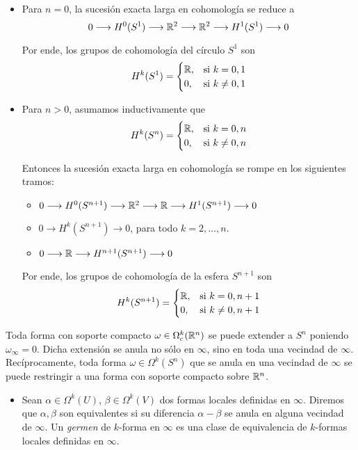 \begin{solution}
\begin{itemize}
    \item Para $n = 0$, la sucesión exacta larga en cohomología se reduce a
    $$
    0
        \longrightarrow H^0(S^1) \longrightarrow \mathbb R^2 \longrightarrow \mathbb R^2
        \longrightarrow H^1(S^1) \longrightarrow 0
    $$
    
    Por ende, los grupos de cohomología del círculo $S^1$ son
    $$
    H^k(S^1) =
        \begin{cases}
            \mathbb R, & \text{si } k = 0, 1 \\
            0, & \text{si } k \ne 0, 1
        \end{cases}
    $$
    
    \item Para $n > 0$, asumamos inductivamente que
    $$
    H^k(S^n) =
        \begin{cases}
            \mathbb R, & \text{si } k = 0, n \\
            0, & \text{si } k \ne 0, n
        \end{cases}
    $$
    
    Entonces la sucesión exacta larga en cohomología se rompe en los siguientes tramos:
    \begin{itemize}
        \item $0
        \longrightarrow H^0(S^{n+1})
        \longrightarrow \mathbb R^2
        \longrightarrow \mathbb R
        \longrightarrow H^1(S^{n+1})
        \longrightarrow 0$
        
        \item $0 \longrightarrow H^k(S^{n+1}) \longrightarrow 0$,
        \hfill para todo $k = 2, \dots, n. \qquad \qquad$
        
        \item $0 \longrightarrow \mathbb R \longrightarrow H^{n+1}(S^{n+1}) \longrightarrow 0$
    \end{itemize}
    
    Por ende, los grupos de cohomología de la esfera $S^{n+1}$ son
    $$
    H^k(S^{n+1}) =
        \begin{cases}
            \mathbb R, & \text{si } k = 0, n+1 \\
            0, & \text{si } k \ne 0, n+1
        \end{cases}
    $$
\end{itemize}
Toda forma con soporte compacto $\omega \in \Omega_c^k(\mathbb R^n)$ se puede extender a $S^n$ poniendo $\omega_\infty = 0$. Dicha extensión se anula no sólo en $\infty$, sino en toda una vecindad de $\infty$. Recíprocamente, toda forma $\omega \in \Omega^k(S^n)$ que se anula en una vecindad de $\infty$ se puede restringir a una forma con soporte compacto sobre $\mathbb R^n$.
\begin{itemize}
    \item Sean $\alpha \in \Omega^k(U)$, $\beta \in \Omega^k(V)$ dos formas locales definidas en $\infty$. Diremos que $\alpha, \beta$ son equivalentes si su diferencia $\alpha - \beta$ se anula en alguna vecindad de $\infty$. Un \textit{germen} de $k$-forma en $\infty$ es una clase de equivalencia de $k$-formas locales definidas en $\infty$.
    

\end{itemize}
\end{solution}
